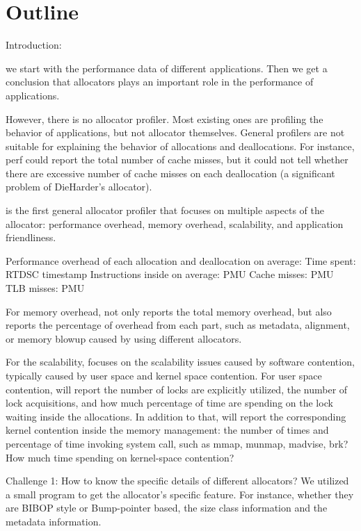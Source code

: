 \section*{Outline}

Introduction: 

we start with the performance data of different applications. Then we get a conclusion that allocators plays an important role in the performance of applications. 

However, there is no allocator profiler. Most existing ones are profiling the behavior of applications, but not allocator themselves. General profilers are not suitable for explaining the behavior of allocations and deallocations. For instance, perf could report the total number of cache misses, but it could not tell whether there are excessive number of cache misses on each deallocation (a significant problem of DieHarder's allocator).

\MP{} is the first general allocator profiler that focuses on multiple aspects of the allocator: performance overhead, memory overhead, scalability, and application friendliness. 

Performance overhead of each allocation and deallocation on average:
Time spent: RTDSC timestamp
Instructions inside on average: PMU
Cache misses: PMU
TLB misses: PMU

For memory overhead, \MP{} not only reports the total memory overhead, but also reports the percentage of overhead from each part, such as metadata, alignment, or memory blowup caused by using different allocators. 

For the scalability, \MP{} focuses on the scalability issues caused by software contention, typically caused by user space and kernel space contention. For user space contention,  \MP{} will report the number of locks are explicitly utilized, the number of lock acquisitions, and how much percentage of time are spending on the lock waiting inside the allocations. In addition to that, \MP{} will report the corresponding kernel contention inside the memory management: the number of times and percentage of time invoking system call, such as mmap, munmap, madvise, brk? How much time spending on kernel-space contention? 


Challenge 1: How to know the specific details of different allocators? We utilized a small program to get the allocator's specific feature. For instance, whether they are BIBOP style or Bump-pointer based, the size class information and the metadata information. 

